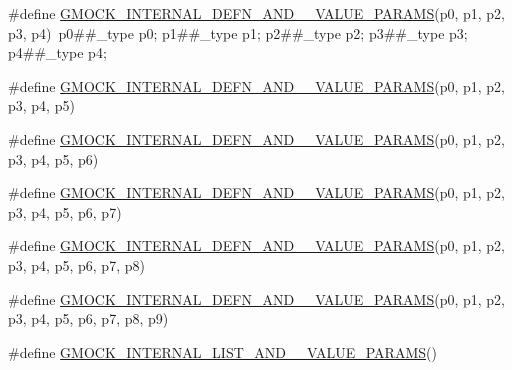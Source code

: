 \begin{DoxyCompactItemize}
\item 
\#define \mbox{\hyperlink{_obj__test_2lib_2googletest-master_2googlemock_2include_2gmock_2gmock-generated-actions_8h_ae8e67227205c5f57cbe9c885271d8f82}{G\+M\+O\+C\+K\+\_\+\+I\+N\+T\+E\+R\+N\+A\+L\+\_\+\+D\+E\+F\+N\+\_\+\+A\+N\+D\+\_\+\_\+\+V\+A\+L\+U\+E\+\_\+\+P\+A\+R\+A\+MS}}(p0,  p1,  p2,  p3,  p4)~p0\#\#\+\_\+type p0; p1\#\#\+\_\+type p1; p2\#\#\+\_\+type p2; p3\#\#\+\_\+type p3; p4\#\#\+\_\+type p4;
\item 
\#define \mbox{\hyperlink{_obj__test_2lib_2googletest-master_2googlemock_2include_2gmock_2gmock-generated-actions_8h_a4ba5920542abfa689a6517d21eb8860a}{G\+M\+O\+C\+K\+\_\+\+I\+N\+T\+E\+R\+N\+A\+L\+\_\+\+D\+E\+F\+N\+\_\+\+A\+N\+D\+\_\+\_\+\+V\+A\+L\+U\+E\+\_\+\+P\+A\+R\+A\+MS}}(p0,  p1,  p2,  p3,  p4,  p5)
\item 
\#define \mbox{\hyperlink{_obj__test_2lib_2googletest-master_2googlemock_2include_2gmock_2gmock-generated-actions_8h_aa0f3292bceb484af4271eb50de9d5ead}{G\+M\+O\+C\+K\+\_\+\+I\+N\+T\+E\+R\+N\+A\+L\+\_\+\+D\+E\+F\+N\+\_\+\+A\+N\+D\+\_\+\_\+\+V\+A\+L\+U\+E\+\_\+\+P\+A\+R\+A\+MS}}(p0,  p1,  p2,  p3,  p4,  p5,  p6)
\item 
\#define \mbox{\hyperlink{_obj__test_2lib_2googletest-master_2googlemock_2include_2gmock_2gmock-generated-actions_8h_a028ed15e5ba3301a85b859792e9fb7c9}{G\+M\+O\+C\+K\+\_\+\+I\+N\+T\+E\+R\+N\+A\+L\+\_\+\+D\+E\+F\+N\+\_\+\+A\+N\+D\+\_\+\_\+\+V\+A\+L\+U\+E\+\_\+\+P\+A\+R\+A\+MS}}(p0,  p1,  p2,  p3,  p4,  p5,  p6,  p7)
\item 
\#define \mbox{\hyperlink{_obj__test_2lib_2googletest-master_2googlemock_2include_2gmock_2gmock-generated-actions_8h_a9565bbd3c2624487ccb71f325fd96596}{G\+M\+O\+C\+K\+\_\+\+I\+N\+T\+E\+R\+N\+A\+L\+\_\+\+D\+E\+F\+N\+\_\+\+A\+N\+D\+\_\+\_\+\+V\+A\+L\+U\+E\+\_\+\+P\+A\+R\+A\+MS}}(p0,  p1,  p2,  p3,  p4,  p5,  p6,  p7,  p8)
\item 
\#define \mbox{\hyperlink{_obj__test_2lib_2googletest-master_2googlemock_2include_2gmock_2gmock-generated-actions_8h_aea3f6f518db8ecc3b63341f38a7c4eaf}{G\+M\+O\+C\+K\+\_\+\+I\+N\+T\+E\+R\+N\+A\+L\+\_\+\+D\+E\+F\+N\+\_\+\+A\+N\+D\+\_\+\_\+\+V\+A\+L\+U\+E\+\_\+\+P\+A\+R\+A\+MS}}(p0,  p1,  p2,  p3,  p4,  p5,  p6,  p7,  p8,  p9)
\item 
\#define \mbox{\hyperlink{_obj__test_2lib_2googletest-master_2googlemock_2include_2gmock_2gmock-generated-actions_8h_a2dbeccb9f6d632f5e7e2c1421cd549aa}{G\+M\+O\+C\+K\+\_\+\+I\+N\+T\+E\+R\+N\+A\+L\+\_\+\+L\+I\+S\+T\+\_\+\+A\+N\+D\+\_\+\_\+\+V\+A\+L\+U\+E\+\_\+\+P\+A\+R\+A\+MS}}()

\end{DoxyCompactItemize}
